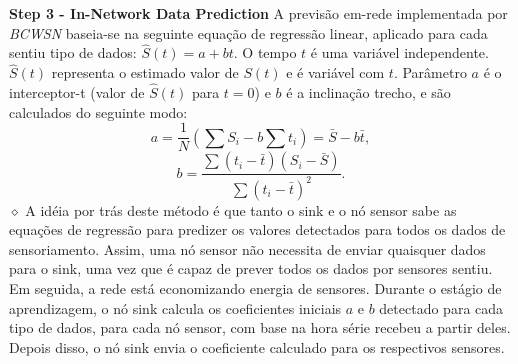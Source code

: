 \documentclass{acm_proc_article-sp}
\newcommand{\dia}{\hspace*{.1cm} \hfill $\diamond$}
\begin{document}
{\bf Step 3 - In-Network Data Prediction}
A previsão em-rede implementada por {\it BCWSN} baseia-se na 
seguinte equação de regressão linear, aplicado para cada sentiu tipo de dados:
$\hat{S}(t) = a + bt$.
O tempo $t$ é uma variável independente. $\hat{S}(t)$ representa o estimado 
valor de $S(t) $ e é variável com $ t $. Parâmetro $ a $ é o interceptor-t 
(valor de $\hat{S}(t)$ para $t=0$) e $b$ é a inclinação trecho, e são calculados 
do seguinte modo:
\begin{equation}
\label{coef-a}
	a = \frac{1}{N}\left(\sum S_{i} - b\sum t_{i} \right) = \bar{S} - b\bar{t},
\end{equation}
\vspace*{-.3cm}
\begin{equation}
\label{coef-b}
	b = \frac{\sum \left(t_{i} - \bar{t}\right)\left(S_{i} - \bar{S}\right)}{\sum \left(t_{i} - \bar{t}\right)^{2}}.
\end{equation}
	\dia
\vspace*{-.4cm}
A idéia por trás deste método é que tanto o sink e o nó sensor sabe as 
equações de regressão para predizer os valores detectados para
todos os dados de sensoriamento. Assim, uma nó sensor não necessita de
enviar quaisquer dados para o sink, uma vez que é capaz de prever 
todos os dados por sensores sentiu. Em seguida, a rede está economizando
energia de sensores\cite{MaiaACR2013}.
\vspace*{-.3cm}
Durante o estágio de aprendizagem, o nó sink calcula os coeficientes
iniciais $a$ e $b$ detectado para cada tipo de dados, para cada nó sensor,
com base na hora série recebeu a partir deles. Depois disso,
o nó sink envia o coeficiente calculado para os respectivos sensores.
\vspace*{-.3cm}
\end{document}
